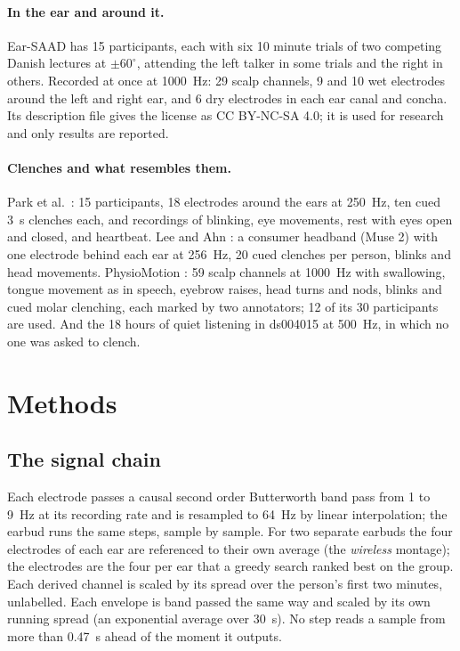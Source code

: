 \documentclass[11pt]{article}
\begin{document}
\paragraph{In the ear and around it.} Ear-SAAD \cite{earsaad,geirnaert2025} has 15 participants, each with six 10 minute trials of two competing Danish lectures at $\pm60^\circ$, attending the left talker in some trials and the right in others. Recorded at once at 1000~Hz: 29 scalp channels, 9 and 10 wet electrodes around the left and right ear, and 6 dry electrodes in each ear canal and concha. Its description file gives the license as CC BY-NC-SA 4.0; it is used for research and only results are reported.

\paragraph{Clenches and what resembles them.} Park et al.\ \cite{park2023ear}: 15 participants, 18 electrodes around the ears at 250~Hz, ten cued 3~s clenches each, and recordings of blinking, eye movements, rest with eyes open and closed, and heartbeat. Lee and Ahn \cite{leeahn2026}: a consumer headband (Muse 2) with one electrode behind each ear at 256~Hz, 20 cued clenches per person, blinks and head movements. PhysioMotion \cite{physiomotion}: 59 scalp channels at 1000~Hz with swallowing, tongue movement as in speech, eyebrow raises, head turns and nods, blinks and cued molar clenching, each marked by two annotators; 12 of its 30 participants are used. And the 18 hours of quiet listening in ds004015 at 500~Hz, in which no one was asked to clench.

\section{Methods}

\subsection{The signal chain}
Each electrode passes a causal second order Butterworth band pass from 1 to 9~Hz at its recording rate and is resampled to 64~Hz by linear interpolation; the earbud runs the same steps, sample by sample. For two separate earbuds the four electrodes of each ear are referenced to their own average (the \emph{wireless} montage); the electrodes are the four per ear that a greedy search ranked best on the group. Each derived channel is scaled by its spread over the person's first two minutes, unlabelled. Each envelope is band passed the same way and scaled by its own running spread (an exponential average over 30~s). No step reads a sample from more than 0.47~s ahead of the moment it outputs.
\end{document}
